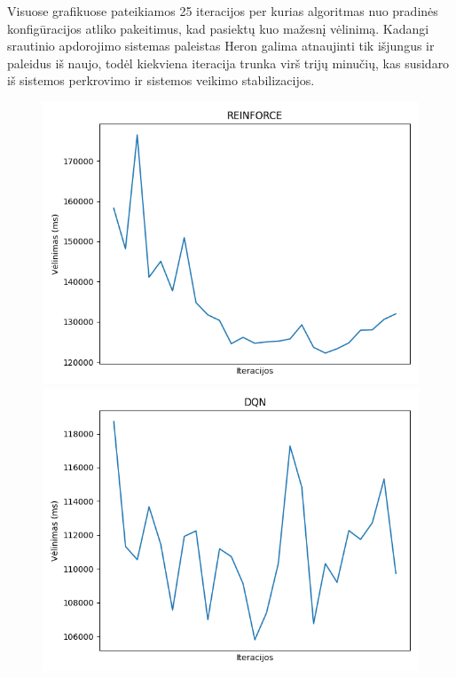 \documentclass{VUMIFPSbakalaurinis}
\begin{document}
Visuose grafikuose pateikiamos 25 iteracijos per kurias algoritmas nuo pradinės konfigūracijos atliko pakeitimus, kad pasiektų kuo mažesnį vėlinimą.
Kadangi srautinio apdorojimo sistemas paleistas Heron galima atnaujinti tik išjungus ir paleidus iš naujo, todėl kiekviena iteracija trunka virš trijų minučių, kas susidaro iš sistemos perkrovimo ir sistemos veikimo stabilizacijos.
\begin{figure}[H]
    \centering
    \begin{minipage}[b]{0.4\textwidth}
        \includegraphics[width=\textwidth]{img/reinforce_50.png}
    \end{minipage}
    \hspace{100mm}
    \begin{minipage}[b]{0.4\textwidth}
        \includegraphics[width=\textwidth]{img/dqn_50.png}

\end{minipage}
\end{figure}
\end{document}
